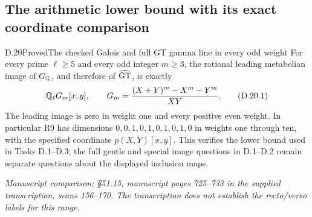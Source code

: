 \subsection{The arithmetic lower bound with its exact coordinate comparison}

\begin{statement}{D.20}{Proved}{The checked Galois and full GT gamma line in every odd weight}
For every prime $\ell\ge5$ and every odd integer $m\ge3$, the
rational leading metabelian image of $G_\mathbb Q$, and therefore of
$\widehat{\rm GT}$, is exactly
\[
 \mathbb Q_\ell G_m[x,y],\qquad
 G_m=\frac{(X+Y)^m-X^m-Y^m}{XY}.
 \tag{D.20.1}
\]
The leading image is zero in weight one and every positive even
weight. In particular R9 has dimensions
$0,0,1,0,1,0,1,0,1,0$ in weights one through ten, with the
specified coordinate $p(X,Y)[x,y]$.
This verifies the lower bound used in Tasks D.1--D.3; the full
gentle and special image questions in D.1--D.2 remain separate
questions about the displayed inclusion maps.
\par\smallskip\noindent\emph{Manuscript comparison: \S51.15,
manuscript pages 725--733 in the supplied transcription,
scans 156--170. The transcription does not establish the
recto/verso labels for this range.}
\end{statement}
